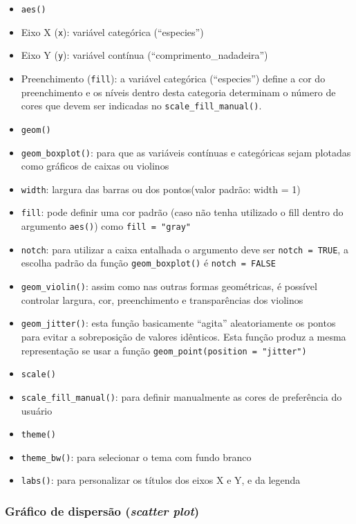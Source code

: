 \documentclass[
]{article}
\providecommand{\tightlist}{%
  \setlength{\itemsep}{0pt}\setlength{\parskip}{0pt}}
\begin{document}
\begin{itemize}
\tightlist
\item
  \texttt{aes()}
\item
  Eixo X (\texttt{x}): variável categórica (``especies'')
\item
  Eixo Y (\texttt{y}): variável contínua (``comprimento\_nadadeira'')
\item
  Preenchimento (\texttt{fill}): a variável categórica (``especies'') define a cor do preenchimento e os níveis dentro desta categoria determinam o número de cores que devem ser indicadas no \texttt{scale\_fill\_manual()}.
\item
  \texttt{geom()}
\item
  \texttt{geom\_boxplot()}: para que as variáveis contínuas e categóricas sejam plotadas como gráficos de caixas ou violinos
\item
  \texttt{width}: largura das barras ou dos pontos(valor padrão: width = 1)
\item
  \texttt{fill}: pode definir uma cor padrão (caso não tenha utilizado o fill dentro do argumento \texttt{aes()}) como \texttt{fill\ =\ "gray"}
\item
  \texttt{notch}: para utilizar a caixa entalhada o argumento deve ser \texttt{notch\ =\ TRUE}, a escolha padrão da função \texttt{geom\_boxplot()} é \texttt{notch\ =\ FALSE}
\item
  \texttt{geom\_violin()}: assim como nas outras formas geométricas, é possível controlar largura, cor, preenchimento e transparências dos violinos
\item
  \texttt{geom\_jitter()}: esta função basicamente ``agita'' aleatoriamente os pontos para evitar a sobreposição de valores idênticos. Esta função produz a mesma representação se usar a função \texttt{geom\_point(position\ =\ "jitter")}
\item
  \texttt{scale()}
\item
  \texttt{scale\_fill\_manual()}: para definir manualmente as cores de preferência do usuário
\item
  \texttt{theme()}
\item
  \texttt{theme\_bw()}: para selecionar o tema com fundo branco
\item
  \texttt{labs()}: para personalizar os títulos dos eixos X e Y, e da legenda
\end{itemize}

\hypertarget{gruxe1fico-de-dispersuxe3o-scatter-plot}{%
\subsubsection{\texorpdfstring{Gráfico de dispersão (\emph{scatter plot})}{Gráfico de dispersão (scatter plot)}}\label{gruxe1fico-de-dispersuxe3o-scatter-plot}}
\end{document}
